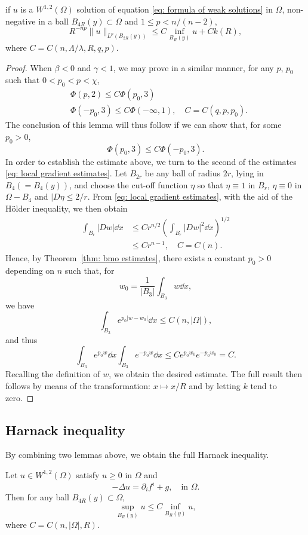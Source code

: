 \begin{lemma}
	if $u$ is a $W^{1,2}(\Omega)$ solution of equation \eqref{eq: formula of weak solutions} in $\Omega$,
	non-negative in a ball $B_{4R}(y)\subset\Omega$ and $1\leq p<n/(n-2)$, 
	\[
		R^{-np}\|u\|_{L^p(B_{2R}(y))} \leq C\inf_{B_R(y)}u + Ck(R),
	\]
	where $C=C(n, \Lambda/\lambda, R, q, p)$.
\end{lemma}
\begin{proof}
	When $\beta<0$ and $\gamma<1$, we may prove in a similar manner, for any $p$, $p_0$ such that 
	$0<p_0 < p < \chi$,
	\begin{align*}
		&\Phi(p,2)\leq C\Phi(p_0,3)\\
		&\Phi(-p_0, 3) \leq C\Phi(-\infty, 1),\quad C = C(q,p,p_0).
	\end{align*}
	The conclusion of this lemma will thus follow if we can show that, for some $p_0 > 0$,
	\[
		\Phi(p_0, 3) \leq C\Phi(-p_0, 3).
	\]
	In order to establish the estimate above, we turn to the second of the estimates \eqref{eq: local gradient estimates}.
	Let $B_{2r}$ be any ball of radius $2r$, lying in $B_4(=B_4(y))$, and choose the cut-off function $\eta$
	so that $\eta\equiv1$ in $B_r$, $\eta\equiv0$ in $\Omega-B_4$ and $|D\eta\leq2/r$.
	From \eqref{eq: local gradient estimates}, with the aid of the H\"older inequality, we then obtain
	\begin{align*}
		\int_{B_r}|Dw|\dd x &\leq Cr^{n/2}\left(\int_{B_r}|Dw|^2\dd x\right)^{1/2}\\
			&\leq Cr^{n-1},\quad C=C(n).
	\end{align*}
	Hence, by Theorem~\ref{thm: bmo estimates}, there exists a constant $p_0>0$ depending on $n$ such that,
	for 
	\[
		w_0 = \frac{1}{|B_3|}\int_{B_3}w\dd x,
	\]
	we have 
	\[
		\int_{B_3}e^{p_0|w-w_0|}\dd x \leq C(n, |\Omega|),
	\]
	and thus
	\[
		\int_{B_3}e^{p_0w}\dd x \int_{B_3}e^{-p_0w}\dd x 
			\leq C e^{p_0w_0}e^{-p_0w_0} = C.
	\]
	Recalling the definition of $w$, we obtain the desired estimate. 
	The full result then follows by means of the transformation: $x\mapsto x/R$ and by letting $k$ tend to zero.
\end{proof}

\subsection{Harnack inequality}

By combining two lemmas above, we obtain the full Harnack inequality.

\begin{theorem}
	Let $u\in W^{1,2}(\Omega)$ satisfy $u\geq0$ in $\Omega$ and 
	\[
		-\Delta u = \partial_if^i + g,\quad \text{in }\Omega.
	\]
	Then for any ball $B_{4R}(y)\subset\Omega$, 
	\[
		\sup_{B_R(y)}u \leq C\inf_{B_R(y)}u,
	\]
	where $C=C(n,|\Omega|,R)$.
\end{theorem}

